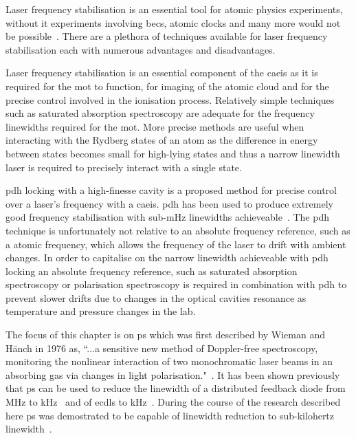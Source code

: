 
Laser frequency stabilisation is an essential tool for atomic physics experiments, without it experiments involving \glspl{bec}, atomic clocks and many more would not be possible~\cite{anderson_observation_1995,ye_quantum_2008}.
There are a plethora of techniques available for laser frequency stabilisation each with numerous advantages and disadvantages.

Laser frequency stabilisation is an essential component of the \gls{caeis} as it is required for the \gls{mot} to function, for imaging of the atomic cloud and for the precise control involved in the ionisation process.
Relatively simple techniques such as saturated absorption spectroscopy are adequate for the frequency linewidths required for the \gls{mot}.
More precise methods are useful when interacting with the Rydberg states of an atom as the difference in energy between states becomes small for high-lying states and thus a narrow linewidth laser is required to precisely interact with a single state.

\Gls{pdh} locking with a high-finesse cavity is a proposed method for precise control over a laser's frequency with a \gls{caeis}.
\Gls{pdh} has been used to produce extremely good frequency stabilisation with sub-\unit[40]{mHz} linewidths achieveable~\cite{kessler_sub-40-mhz-linewidth_2012}.
The \gls{pdh} technique is unfortunately not relative to an absolute frequency reference, such as a atomic frequency, which allows the frequency of the laser to drift with ambient changes.
In order to capitalise on the narrow linewidth achieveable with \gls{pdh} locking an absolute frequency reference, such as saturated absorption spectroscopy or polarisation spectroscopy is required in combination with \gls{pdh} to prevent slower drifts due to changes in the optical cavities resonance as temperature and pressure changes in the lab.

The focus of this chapter is on \gls{ps} which was first described by Wieman and H\"anch in 1976 as, ``...a sensitive new method of Doppler-free spectroscopy, monitoring the nonlinear interaction of two monochromatic laser beams in an absorbing gas via changes in light polarisation."~\cite{wieman_doppler-free_1976,demtroder_laser_2003}.
It has been shown previously that \gls{ps} can be used to reduce the linewidth of a distributed feedback diode from \unit[2]{MHz} to \unit[20]{kHz}~\cite{torii_laser-phase_2012} and of \glspl{ecdl} to \unit[65]{kHz}~\cite{yoshikawa_frequency_2003}.
During the course of the research described here \gls{ps} was demostrated to be capable of linewidth reduction to sub-kilohertz linewidth~\cite{torrance_sub-kilohertz_2016}.

